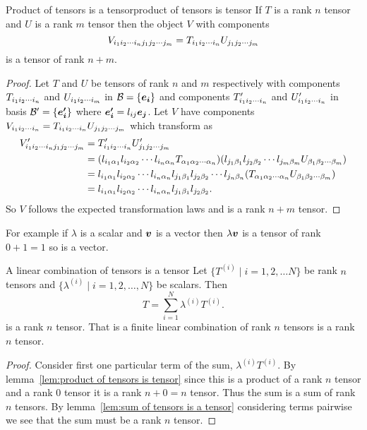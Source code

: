 \begin{lemma}{Product of tensors is a tensor}{product of tensors is tensor}
    If \(T\) is a rank \(n\) tensor and \(U\) is a rank \(m\) tensor then the object \(V\) with components
    \[V_{{ {i}_1 {i}_2 \dotsm {i}_{n} }{ {j}_1 {j}_2 \dotsm {j}_{m} }} = T_{{ {i}_1 {i}_2 \dotsm {i}_{n} }}U_{{ {j}_1 {j}_2 \dotsm {j}_{m} }}\]
    is a tensor of rank \(n + m\).
\end{lemma}
\begin{proof}
    Let \(T\) and \(U\) be tensors of rank \(n\) and \(m\) respectively with components \(T_{ {i}_1 {i}_2 \dotsm {i}_{n} }\) and \(U_{ {i}_1 {i}_2 \dotsm {i}_{m} }\) in \(\mathcal{B} = \{\bm{e_{i}}\}\) and components \(T'_{ {i}_1 {i}_2 \dotsm {i}_{n} }\) and \(U'_{ {i}_1 {i}_2 \dotsm {i}_{n} }\) in basis \(\mathcal{B}' = \{\bm{e'_{i}}\}\) where \(\bm{e'_{i}} = l_{ij}\bm{e_{j}}\).
    Let \(V\) have components \(V_{ {i}_1 {i}_2 \dotsm {i}_{n} } = T_{ {i}_1 {i}_2 \dotsm {i}_{n} } U_{ {j}_1 {j}_2 \dotsm {j}_{m} }\) which transform as
    \begin{align*}
        V'_{{ {i}_1 {i}_2 \dotsm {i}_{n} }{ {j}_1 {j}_2 \dotsm {j}_{m} }} &= T'_{{ {i}_1 {i}_2 \dotsm {i}_{n} }}U'_{{ {j}_1 {j}_2 \dotsm {j}_{m} }}\\
        &= (l_{i_1\alpha_1}l_{i_2\alpha_2} \dotsm l_{i_n\alpha_n} T_{{ {\alpha}_1 {\alpha}_2 \dotsm {\alpha}_{n} }})(l_{j_1\beta_1}l_{j_2\beta_2} \dotsm l_{j_m\beta_m} U_{{ {\beta}_1 {\beta}_2 \dotsm {\beta}_{m} }})\\
        &= l_{i_1\alpha_1}l_{i_2\alpha_2} \dotsm l_{i_n\alpha_n} l_{j_1\beta_1}l_{j_2\beta_2} \dotsm l_{j_n\beta_n} (T_{{ {\alpha}_1 {\alpha}_2 \dotsm {\alpha}_{n} }}U_{{ {\beta}_1 {\beta}_2 \dotsm {\beta}_{m} }})\\
        &= l_{i_1\alpha_1}l_{i_2\alpha_2} \dotsm l_{i_n\alpha_n} l_{j_1\beta_1}l_{j_2\beta_2}.
    \end{align*}
    So \(V\) follows the expected transformation laws and is a rank \(n + m\) tensor.
\end{proof}
For example if \(\lambda\) is a scalar and \(\bm{v}\) is a vector then \(\lambda\bm{v}\) is a tensor of rank \(0 + 1 = 1\) so is a vector.

\begin{corollary}{A linear combination of tensors is a tensor}{}
    Let \(\{T^{(i)}\mid i = 1, 2, \dotsc N \}\) be rank \(n\) tensors and \(\{\lambda^{(i)}\mid i = 1, 2, \dotsc, N\}\) be scalars.
    Then
    \[T = \sum_{i=1}^{N} \lambda^{(i)}T^{(i)}.\]
    is a rank \(n\) tensor.
    That is a finite linear combination of rank \(n\) tensors is a rank \(n\) tensor.
\end{corollary}
\begin{proof}
    Consider first one particular term of the sum, \(\lambda^{(i)}T^{(i)}\).
    By lemma~\ref{lem:product of tensors is tensor} since this is a product of a rank \(n\) tensor and a rank \(0\) tensor it is a rank \(n + 0 = n\) tensor.
    Thus the sum is a sum of rank \(n\) tensors.
    By lemma~\ref{lem:sum of tensors is a tensor} considering terms pairwise we see that the sum must be a rank \(n\) tensor.
\end{proof}

